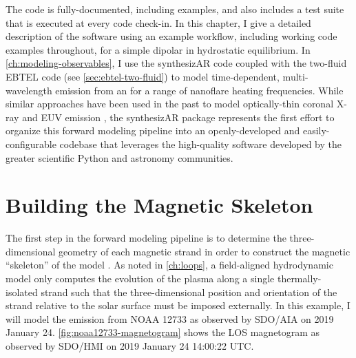 The code is fully-documented, including examples, and also includes a test suite that is executed at every code check-in. In this chapter, I give a detailed description of the software using an example workflow, including working code examples throughout, for a simple dipolar \AR{} in hydrostatic equilibrium. In \autoref{ch:modeling-observables}, I use the synthesizAR code coupled with the two-fluid EBTEL code (see \autoref{sec:ebtel-two-fluid}) to model time-dependent, multi-wavelength emission from an \AR{} for a range of nanoflare heating frequencies. While similar approaches have been used in the past to model optically-thin coronal X-ray and EUV emission \citep[e.g.][]{warren_hydrostatic_2006,schrijver_coronal_2004,lundquist_forward_2008,lundquist_forward_2008-1,bradshaw_patterns_2016,allred_3d_2018}, the synthesizAR package represents the first effort to organize this forward modeling pipeline into an openly-developed and easily-configurable codebase that leverages the high-quality software developed by the greater scientific Python and astronomy communities.

\section{Building the Magnetic Skeleton}

The first step in the forward modeling pipeline is to determine the three-dimensional geometry of each magnetic strand in order to construct the magnetic ``skeleton'' of the model \AR{}. As noted in \autoref{ch:loops}, a field-aligned hydrodynamic model only computes the evolution of the plasma along a single thermally-isolated strand such that the three-dimensional position and orientation of the strand relative to the solar surface must be imposed externally. In this example, I will model the emission from \AR{} NOAA 12733 as observed by SDO/AIA on 2019 January 24. \autoref{fig:noaa12733-magnetogram} shows the LOS magnetogram as observed by SDO/HMI on 2019 January 24 14:00:22 UTC.

